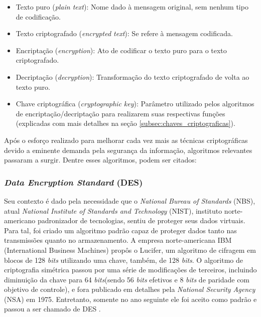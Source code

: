\documentclass[a4paper,10pt,oneside,conference,final,keeplastbox]{inatel}
\newcommand{\bits}{\textit{bits}\xspace}
\begin{document}
            \begin{itemize}
                \item Texto puro (\textit{plain text}):
                Nome dado à mensagem original, sem nenhum tipo de codificação.
                
                \item Texto criptografado (\textit{encrypted text}):
                Se refere à mensagem codificada.
                
                \item Encriptação (\textit{encryption}):
                Ato de codificar o texto puro para o texto criptografado.
                
                \item Decriptação (\textit{decryption}):
                Transformação do texto criptografado de volta ao texto puro.
                
                \item Chave criptográfica (\textit{cryptographic key}):
                Parâmetro utilizado pelos algoritmos de encriptação/decriptação para realizarem suas respectivas funções (explicadas com mais detalhes na seção \ref{subsec:chaves_criptograficas}).
                
            \end{itemize}
                
            Após o esforço realizado para melhorar cada vez mais as técnicas criptográficas devido a eminente demanda pela segurança da informação, algoritmos relevantes passaram a surgir. Dentre esses algoritmos, podem ser citados:
            
            \subsubsection{\textit{Data Encryption Standard} (DES)}
            \label{subsubsec:des}
                
                Seu contexto é dado pela necessidade que o \textit{National Bureau of Standards} (NBS), atual \textit{National Institute of Standards and Technology} (NIST), instituto norte-americano padronizador de tecnologias, sentiu de proteger seus dados virtuais. Para tal, foi criado um algoritmo padrão capaz de proteger dados tanto nas transmissões quanto no armazenamento. A empresa norte-americana IBM (International Business Machines) propôs o Lucifer, um algoritmo de cifragem em blocos de 128 \bits utilizando uma chave, também, de 128 \bits \cite{terada2000seguranca}. O algoritmo de criptografia simétrica passou por uma série de modificações de terceiros, incluindo diminuição da chave para 64 \bits (sendo 56 \bits efetivos e 8 \bits de paridade com objetivo de controle), e fora publicado em detalhes pela \textit{National Security Agency} (NSA) em 1975. Entretanto, somente no ano seguinte ele foi aceito como padrão e passou a ser chamado de DES \cite{grabbe1992algorithm}.
                
\end{document}
